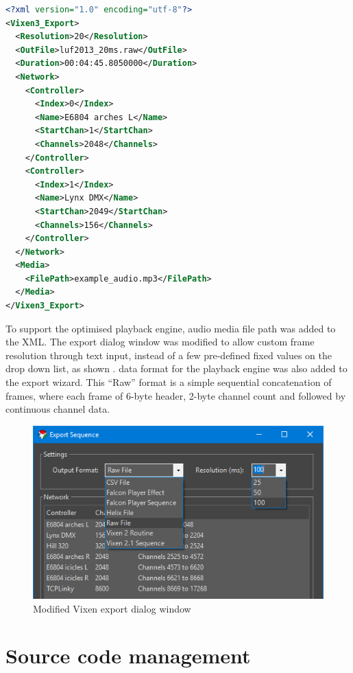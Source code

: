 \begin{lstlisting}[float,floatplacement=ht,language=XML,label=lst:network_xml,captionpos=b,caption={\footnotesize Example controller mapping XML file}]
<?xml version="1.0" encoding="utf-8"?>
<Vixen3_Export>
  <Resolution>20</Resolution>
  <OutFile>luf2013_20ms.raw</OutFile>
  <Duration>00:04:45.8050000</Duration>
  <Network>
    <Controller>
      <Index>0</Index>
      <Name>E6804 arches L</Name>
      <StartChan>1</StartChan>
      <Channels>2048</Channels>
    </Controller>
    <Controller>
      <Index>1</Index>
      <Name>Lynx DMX</Name>
      <StartChan>2049</StartChan>
      <Channels>156</Channels>
    </Controller>
  </Network>
  <Media>
    <FilePath>example_audio.mp3</FilePath>
  </Media>
</Vixen3_Export>
\end{lstlisting}

To support the  optimised playback engine, audio media file path was added to the XML. The export dialog window was modified to allow custom frame resolution through text input, instead of a few pre-defined fixed values on the drop down list, as shown  .  data format  for the playback engine was also added to the export wizard. This ``Raw'' format is a simple sequential concatenation of frames, where each frame  of 6-byte header, 2-byte channel count and  followed by continuous channel data.

\begin{figure}[t]
  \centering
  \includegraphics[width=0.75\columnwidth]{Figs/vixen_export.png}
  \caption{\footnotesize Modified Vixen export dialog window}
  \label{fig:vixen_export}
\end{figure}

\section{Source code management}


